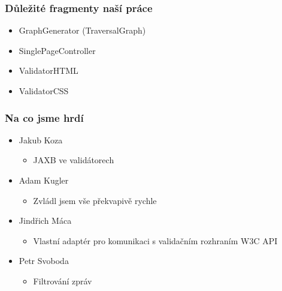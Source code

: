 \documentclass{beamer}
\begin{document}
\begin{frame}[allowframebreaks]\frametitle{Důležité fragmenty naší práce}
  \begin{itemize}
    \item GraphGenerator (TraversalGraph)
		\item SinglePageController
		\item ValidatorHTML
		\item ValidatorCSS
  \end{itemize}
\end{frame}

\begin{frame}[allowframebreaks]\frametitle{Na co jsme hrdí} 
  \begin{itemize}
    \item Jakub Koza
      \begin{itemize}
       \item JAXB ve validátorech
     \end{itemize}
   
    \item Adam Kugler
      \begin{itemize}
       \item Zvládl jsem vše překvapivě rychle
     \end{itemize}

    \item Jindřich Máca
      \begin{itemize}
       \item Vlastní adaptér pro komunikaci s validačním rozhraním W3C API
      \end{itemize}  
   
    \item Petr Svoboda
      \begin{itemize}
       \item Filtrování zpráv
     \end{itemize}
   \end{itemize}  
\end{frame}
\end{document}
